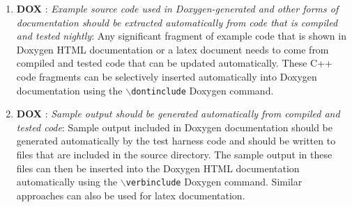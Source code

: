 \begin{enumerate}
{\small\begin{verbatim}

  class SomeClass : public Teuchos::ParameterListAcceptor {
  public:

    ...

    /** \name Overriden from Teuchos::ParameterListAccpetor */
    //@{

    /** \brief . */
    void setParameterList(
      Teuchos::RCP<Teuchos::ParameterList> const& paramList);
    /** \brief . */
    Teuchos::RCP<Teuchos::ParameterList> getParameterList();
    /** \brief . */
    Teuchos::RCP<Teuchos::ParameterList> unsetParameterList();
    /** \brief . */
    Teuchos::RCP<const Teuchos::ParameterList> getParameterList() const;
    /** \brief . */
    Teuchos::RCP<const Teuchos::ParameterList> getValidParameters() const;

    //@}

    ...

  };

\end{verbatim}}

{}\item{}\textbf{DOX }:
{}\textit{Example source code used in Doxygen-generated and other forms
of documentation should be extracted automatically from code that is compiled
and tested nightly}: Any significant fragment of example code that is shown in
Doxygen HTML documentation or a latex document needs to come from compiled and
tested code that can be updated automatically.  These C++ code fragments can
be selectively inserted automatically into Doxygen documentation using the
{}\texttt{$\backslash$dontinclude} Doxygen command.

{}\item{}\textbf{DOX }:
{}\textit{Sample output should be generated automatically from compiled
and tested code}: Sample output included in Doxygen documentation should be
generated automatically by the test harness code and should be written to
files that are included in the source directory.  The sample output in these
files can then be inserted into the Doxygen HTML documentation automatically
using the {}\texttt{$\backslash$verbinclude} Doxygen command.  Similar
approaches can also be used for latex documentation.

\end{enumerate}

